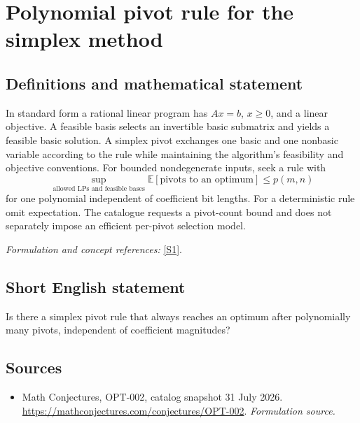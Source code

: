 \documentclass[11pt]{article}
\begin{document}
\section*{\texorpdfstring{Polynomial pivot rule for the simplex method}{Polynomial pivot rule for the simplex method}}\label{131}
\subsection{Definitions and mathematical statement}
In standard form a rational linear program has $Ax=b$, $x\ge0$, and a linear objective. A feasible basis selects an invertible basic submatrix and yields a feasible basic solution. A simplex pivot exchanges one basic and one nonbasic variable according to the rule while maintaining the algorithm's feasibility and objective conventions. For bounded nondegenerate inputs, seek a rule with
\[
 \sup_{\text{allowed LPs and feasible bases}}\mathbb E[\text{pivots to an optimum}]
 \le p(m,n)
\]
for one polynomial independent of coefficient bit lengths. For a deterministic rule omit expectation. The catalogue requests a pivot-count bound and does not separately impose an efficient per-pivot selection model.
\par\smallskip\textit{Formulation and concept references:} \href{https://mathconjectures.com/conjectures/OPT-002}{[S1]}.

\subsection{Short English statement}
Is there a simplex pivot rule that always reaches an optimum after polynomially many pivots, independent of coefficient magnitudes?
\subsection{Sources}
\begin{itemize}
\item[S1]Math Conjectures, OPT-002, catalog snapshot 31 July 2026.
\url{https://mathconjectures.com/conjectures/OPT-002}.
\textit{Formulation source.}
\end{itemize}
\end{document}

